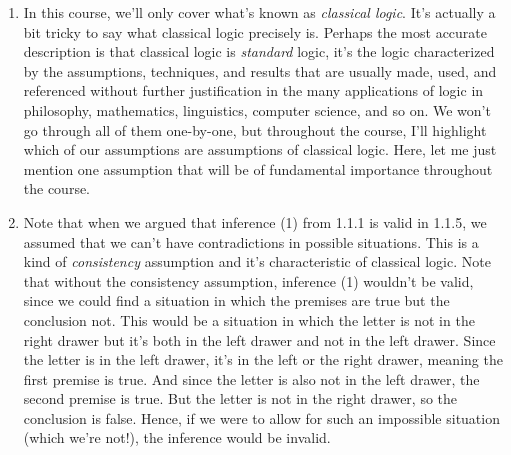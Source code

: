 \begin{enumerate}[\thesection.1]

	\item In this course, we'll only cover what's known as \emph{classical logic}. It's actually a bit tricky to say what classical logic precisely is. Perhaps the most accurate description is that classical logic is \emph{standard} logic, it's the logic characterized by the assumptions, techniques, and results that are usually made, used, and referenced without further justification in the many applications of logic in philosophy, mathematics, linguistics, computer science, and so on. We won't go through all of them one-by-one, but throughout the course, I'll highlight which of our assumptions are assumptions of classical logic. Here, let me just mention one assumption that will be of fundamental importance throughout the course.
	
	\item Note that when we argued that inference (1) from 1.1.1 is valid in 1.1.5, we assumed that we can't have contradictions in possible situations. This is a kind of \emph{consistency} assumption and it's characteristic of classical logic. Note that without the consistency assumption, inference (1) wouldn't be valid, since we could find a situation in which the premises are true but the conclusion not. This would be a situation in which the letter is not in the right drawer but it's both in the left drawer and not in the left drawer. 	Since the letter is in the left drawer, it's in the left or the right drawer, meaning the first premise is true. And since the letter is also not in the left drawer, the second premise is true. But the letter is not in the right drawer, so the conclusion is false. Hence, if we were to allow for such an impossible situation (which we're not!), the inference would be invalid.
	

\end{enumerate}
